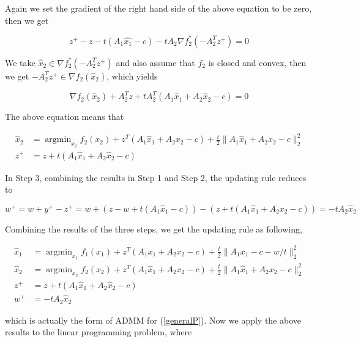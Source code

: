 \documentclass[a4paper]{article}
\begin{document}
Again we set the gradient of the right hand side of the above equation to be zero, then we get

\begin{equation}
z^+ - z - t(A_1\hat{x_1}-c) - tA_2\nabla f_2^*(-A_2^Tz^+) = 0
\end{equation}

We take $ \hat{x}_2 \in \nabla f_2^*(-A_2^Tz^+)$ and also assume that $f_2$ is closed and convex, then we get $-A_2^Tz^+ \in \nabla f_2(\hat{x}_2)$, which yields 

\begin{equation}
\nabla f_2(\hat{x}_2) + A_2^Tz + tA_2^T(A_1\hat{x}_1+A_2\hat{x}_2-c) = 0
\end{equation} 

The above equation means that 

\begin{equation}
\begin{split}
\hat{x}_2 &= \mathop{\arg\min}_{x_2} f_2(x_2)+z^T(A_1\hat{x}_1 + A_2x_2-c)+
\frac{t}{2}\lVert A_1\hat{x}_1+A_2x_2-c\rVert_2^2\\
z^+ & = z + t(A_1\hat{x}_1+A_2\hat{x}_2-c)
\end{split}
\end{equation}

In Step 3, combining the results in Step 1 and Step 2, the updating rule reduces to 

\begin{equation}
w^+ = w+y^+-z^+ =w + (z-w+t(A_1\hat{x}_1-c))-(z + t(A_1\hat{x}_1+A_2x_2-c)) = -tA_2\hat{x}_2
\end{equation}

Combining the results of the three steps, we get the updating rule as following, 

\begin{equation}
\begin{split}
\hat{x}_1 & = \mathop{\arg\min}_{x_1}f_1(x_1)+z^T(A_1x_1+A_2x_2-c)+
\frac{t}{2}\lVert A_1x_1-c-w/t\rVert_2^2\\
\hat{x}_2 &= \mathop{\arg\min}_{x_2} f_2(x_2)+z^T(A_1\hat{x}_1 + A_2x_2-c)+
\frac{t}{2}\lVert A_1\hat{x}_1+A_2x_2-c\rVert_2^2\\
z^+ & = z + t(A_1\hat{x}_1+A_2\hat{x}_2-c)\\
w^+ &= -tA_2\hat{x}_2
\end{split}
\end{equation}  

which is actually the form of ADMM for (\ref{generalP}). Now we apply the above results to the linear programming problem, where\\ 
\end{document}
